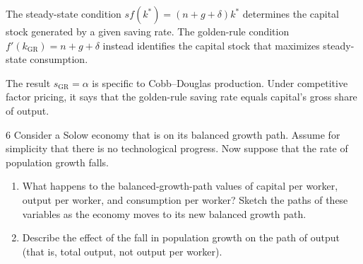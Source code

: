 \begin{note}
    The steady-state condition \(sf(k^*)=(n+g+\delta)k^*\) determines the capital
    stock generated by a given saving rate. The golden-rule condition
    \(f'(k_{\mathrm{GR}})=n+g+\delta\) instead identifies the capital stock that
    maximizes steady-state consumption.
\end{note}

\begin{note}
    The result \(s_{\mathrm{GR}}=\alpha\) is specific to Cobb--Douglas production.
    Under competitive factor pricing, it says that the golden-rule saving rate equals
    capital's gross share of output.
\end{note}

\begin{problem}{6}
Consider a Solow economy that is on its balanced growth path. Assume for simplicity that there is
no technological progress. Now suppose that the rate of population growth falls.
\begin{enumerate}[label=(\alph*)]
    \item What happens to the balanced-growth-path values of capital per worker, output per worker,
    and consumption per worker? Sketch the paths of these variables as the economy moves to its new
    balanced growth path.
    \item Describe the effect of the fall in population growth on the path of output (that is,
    total output, not output per worker).
\end{enumerate}
\end{problem}

